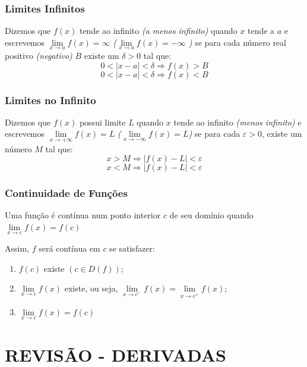 \documentclass[hyperref={pdfpagelabels=false}]{beamer}
\begin{document}
\begin{frame}
\frametitle{Limites Infinitos}

\begin{definition}
	Dizemos que $f(x)$ tende ao infinito \emph{ (a menos infinito)} quando $x$ tende a $a$ e escrevemos $\lim\limits_{x \rightarrow a}f(x) = \infty$ \emph{($\lim\limits_{x \rightarrow a}f(x) = - \infty$ )} se para cada número real positivo \emph{(negativo)} $B$ existe um $\delta > 0$ tal que:
	$$0<|x-a|<\delta \Rightarrow f(x) >B $$
	$$0<|x-a|<\delta \Rightarrow f(x) <B $$	
\end{definition}


\end{frame}

\begin{frame}
\frametitle{Limites no Infinito}

\begin{definition}
	Dizemos que $f(x)$ possui limite $L$ quando $x$ tende ao infinito \emph{(menos infinito)} e escrevemos $\lim\limits_{x \rightarrow + \infty}f(x) = L$ \emph{($\lim\limits_{x \rightarrow - \infty}f(x) = L$)} se para cada $\varepsilon > 0$, existe um número $M$ tal que:
	$$x > M \Rightarrow |f(x) - L| < \varepsilon$$
	$$x < M \Rightarrow |f(x) - L| < \varepsilon$$
\end{definition}

\end{frame}

\begin{frame}
\frametitle{Continuidade de Funções}

Uma função é contínua num ponto interior $c$ de seu domínio quando $\lim\limits_{x \rightarrow c}f(x) = f(c)$

\pause

Assim, $f$ será contínua em $c$ se satisfazer:
\begin{enumerate}
	\item $f(c)$ existe $(c \in D(f))$;
	\item $\lim\limits_{x \rightarrow c}f(x)$ existe, ou seja, $\lim\limits_{x \rightarrow c^{-}}f(x) = \lim\limits_{x \rightarrow c^{+}}f(x)$;
	\item $\lim\limits_{x \rightarrow c}f(x) = f(c)$
\end{enumerate}

\end{frame}

\section{REVISÃO - DERIVADAS}
\end{document}
